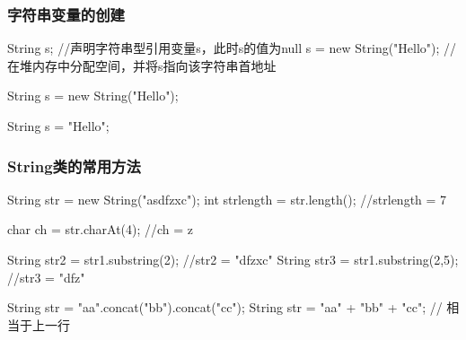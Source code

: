 \begin{frame}[fragile]
  \frametitle{字符串变量的创建}


  
  \begin{javaCode}
    String s;                  //声明字符串型引用变量s，此时s的值为null
    s = new String("Hello");   //在堆内存中分配空间，并将s指向该字符串首地址 
  \end{javaCode}

  \begin{javaCode}
    String s = new String("Hello");
  \end{javaCode}

  \begin{javaCode}
    String s = "Hello";
  \end{javaCode}

\end{frame}

\begin{frame}[fragile]
  \frametitle{String类的常用方法}


  \begin{javaCode}
    String str = new String("asdfzxc");
    int strlength = str.length(); //strlength = 7
  \end{javaCode}


  \begin{javaCode}
    char ch = str.charAt(4); //ch = z
  \end{javaCode}


  \begin{javaCode}
    String str2 = str1.substring(2); //str2 = "dfzxc"
    String str3 = str1.substring(2,5); //str3 = "dfz"
  \end{javaCode}


  \begin{javaCode}
    String str = "aa".concat("bb").concat("cc");
    String str = "aa" + "bb" + "cc"; // 相当于上一行
  \end{javaCode}

\end{frame}

